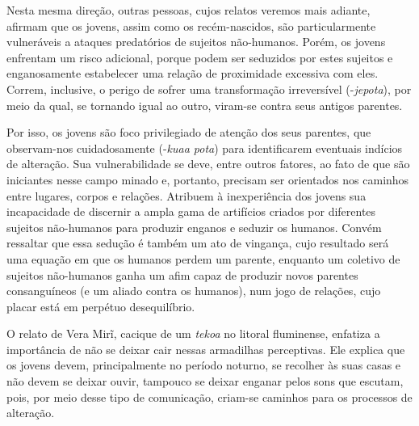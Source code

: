 Nesta mesma direção, outras pessoas, cujos relatos veremos mais adiante,
afirmam que os jovens, assim como os recém-nascidos, são
particularmente vulneráveis a ataques predatórios de sujeitos
não-humanos. Porém, os jovens enfrentam um risco adicional, porque
podem ser seduzidos por estes sujeitos e enganosamente estabelecer uma
relação de proximidade excessiva com eles. Correm, inclusive, o perigo
de sofrer uma transformação irreversível (-\emph{jepota}), por meio da qual,
se tornando igual ao outro, viram-se contra seus antigos parentes.

Por isso, os jovens são foco privilegiado de atenção dos seus parentes,
que observam-nos cuidadosamente (-\emph{kuaa pota}) para identificarem
eventuais indícios de alteração. Sua vulnerabilidade se deve, entre
outros fatores, ao fato de que são iniciantes nesse campo minado e,
portanto, precisam ser orientados nos caminhos entre lugares, corpos e
relações. Atribuem à inexperiência dos jovens sua incapacidade de
discernir a ampla gama de artifícios criados por diferentes sujeitos
não-humanos para produzir enganos e seduzir os humanos. Convém
ressaltar que essa sedução é também um ato de vingança, cujo resultado
será uma equação em que os humanos perdem um parente, enquanto um
coletivo de sujeitos não-humanos ganha um afim capaz de produzir novos
parentes consanguíneos (e um aliado contra os humanos), num jogo de
relações, cujo placar está em perpétuo desequilíbrio.

O relato de Vera Mirĩ, cacique de um \emph{tekoa} no litoral fluminense,
enfatiza a importância de não se deixar cair nessas armadilhas
perceptivas. Ele explica que os jovens devem, principalmente no período
noturno, se recolher às suas casas e não devem se deixar ouvir,
tampouco se deixar enganar pelos sons que escutam, pois, por meio desse
tipo de comunicação, criam-se caminhos para os processos de alteração.

\bigskip

